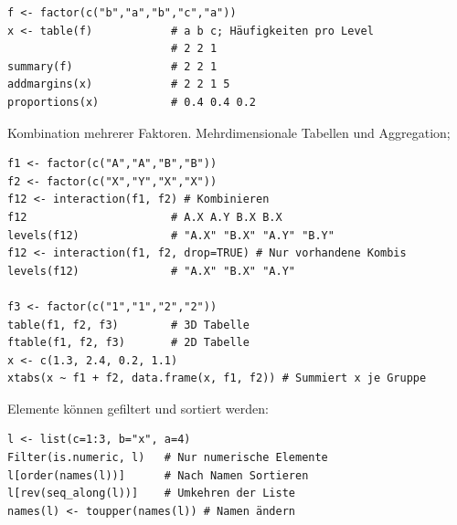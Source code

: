 \documentclass[10pt,twocolumn]{scrartcl}
\begin{document}
\begin{lstlisting}
f <- factor(c("b","a","b","c","a"))
x <- table(f)            # a b c; Häufigkeiten pro Level
                         # 2 2 1
summary(f)               # 2 2 1
addmargins(x)            # 2 2 1 5
proportions(x)           # 0.4 0.4 0.2
\end{lstlisting}

Kombination mehrerer Faktoren. Mehrdimensionale Tabellen und Aggregation;

\begin{lstlisting}
f1 <- factor(c("A","A","B","B"))
f2 <- factor(c("X","Y","X","X"))
f12 <- interaction(f1, f2) # Kombinieren
f12                      # A.X A.Y B.X B.X
levels(f12)              # "A.X" "B.X" "A.Y" "B.Y"
f12 <- interaction(f1, f2, drop=TRUE) # Nur vorhandene Kombis
levels(f12)              # "A.X" "B.X" "A.Y"

f3 <- factor(c("1","1","2","2"))
table(f1, f2, f3)        # 3D Tabelle
ftable(f1, f2, f3)       # 2D Tabelle
x <- c(1.3, 2.4, 0.2, 1.1)
xtabs(x ~ f1 + f2, data.frame(x, f1, f2)) # Summiert x je Gruppe
\end{lstlisting}


Elemente können gefiltert und sortiert werden:

\begin{lstlisting}
l <- list(c=1:3, b="x", a=4)
Filter(is.numeric, l)   # Nur numerische Elemente
l[order(names(l))]      # Nach Namen Sortieren
l[rev(seq_along(l))]    # Umkehren der Liste
names(l) <- toupper(names(l)) # Namen ändern
\end{lstlisting}



\fi
\end{document}
